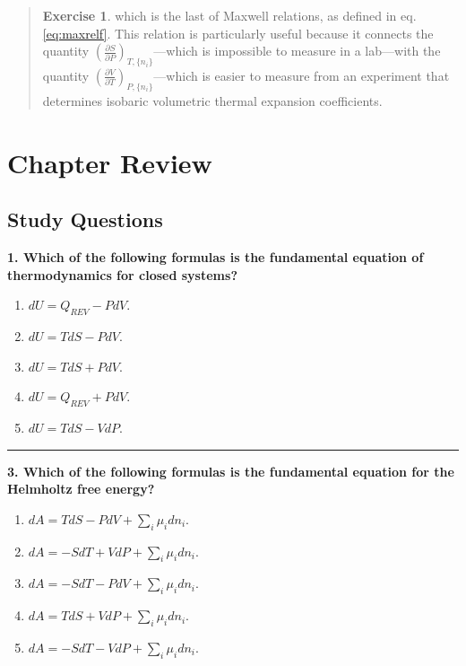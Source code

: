 \documentclass[
  9pt,
]{extbook}
\providecommand{\tightlist}{%
  \setlength{\itemsep}{0pt}\setlength{\parskip}{0pt}}
\theoremstyle{definition}
\theoremstyle{definition}
\theoremstyle{definition}
\newtheorem{exercise}{Exercise}[chapter]
\theoremstyle{definition}
\theoremstyle{remark}
\begin{document}
\begin{quote}
\begin{exercise}
which is the last of Maxwell relations, as defined in eq. \eqref{eq:maxrelf}. This relation is particularly useful because it connects the quantity \(\left(\frac{\partial S}{\partial P} \right)_{T,\{n_i\}}\)---which is impossible to measure in a lab---with the quantity \(\left(\frac{\partial V}{\partial T} \right)_{P,\{n_i\}}\)---which is easier to measure from an experiment that determines isobaric volumetric thermal expansion coefficients.
\end{exercise}
\end{quote}

\section{Chapter Review}\label{rev8}

\subsection{Study Questions}\label{quest8}

\textbf{1. Which of the following formulas is the fundamental equation of thermodynamics for closed systems?}

\begin{enumerate}
\def\labelenumi{\alph{enumi}.}
\tightlist
\item
  \(dU = Q_{REV} - PdV\).
\item
  \(dU = TdS - PdV\).
\item
  \(dU = TdS + PdV\).
\item
  \(dU = Q_{REV} + PdV\).
\item
  \(dU = TdS - VdP\).
\end{enumerate}

\begin{center}\rule{0.5\linewidth}{0.5pt}\end{center}

\textbf{3. Which of the following formulas is the fundamental equation for the Helmholtz free energy?}

\begin{enumerate}
\def\labelenumi{\alph{enumi}.}
\tightlist
\item
  \(dA = TdS - PdV + \sum_i \mu_i dn_i\).
\item
  \(dA = -SdT + VdP + \sum_i \mu_i dn_i\).
\item
  \(dA = -SdT - PdV + \sum_i \mu_i dn_i\).
\item
  \(dA = TdS + VdP + \sum_i \mu_i dn_i\).
\item
  \(dA = -SdT - VdP + \sum_i \mu_i dn_i\).
\end{enumerate}
\end{document}

